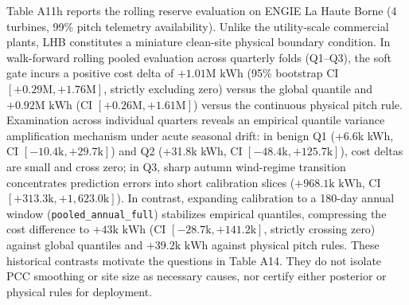 \documentclass[
  journal]{IEEEtran}
\begin{document}
Table A11h reports the rolling reserve evaluation on ENGIE La Haute
Borne (4 turbines, 99\% pitch telemetry availability). Unlike the
utility-scale commercial plants, LHB constitutes a miniature clean-site
physical boundary condition. In walk-forward rolling pooled evaluation
across quarterly folds (Q1--Q3), the soft gate incurs a positive cost
delta of \(+1.01\text{M kWh}\) (95\% bootstrap CI
\([+0.29\text{M}, +1.76\text{M}]\), strictly excluding zero) versus the
global quantile and \(+0.92\text{M kWh}\) (CI
\([+0.26\text{M}, +1.61\text{M}]\)) versus the continuous physical pitch
rule. Examination across individual quarters reveals an empirical
quantile variance amplification mechanism under acute seasonal drift: in
benign Q1 (+6.6k kWh, CI \([-10.4\text{k}, +29.7\text{k}]\)) and Q2
(+31.8k kWh, CI \([-48.4\text{k}, +125.7\text{k}]\)), cost deltas are
small and cross zero; in Q3, sharp autumn wind-regime transition
concentrates prediction errors into short calibration slices
(\(+968.1\text{k kWh}\), CI \([+313.3\text{k}, +1,623.0\text{k}]\)). In
contrast, expanding calibration to a 180-day annual window
(\texttt{pooled\_annual\_full}) stabilizes empirical quantiles,
compressing the cost difference to \(+43\text{k kWh}\) (CI
\([-28.7\text{k}, +141.2\text{k}]\), strictly crossing zero) against
global quantiles and \(+39.2\text{k kWh}\) against physical pitch rules.
These historical contrasts motivate the questions in Table A14. They do
not isolate PCC smoothing or site size as necessary causes, nor certify
either posterior or physical rules for deployment.
\end{document}
